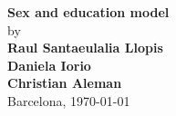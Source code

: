 \begin{center} 

\sf
\Large{
\textbf{Sex and education model}\\
\vspace{0.5cm}
\Large {by}\\  
\vspace{0.25cm}
\textbf{Raul Santaeulalia Llopis}\\
\vspace{0.25cm}
\textbf{Daniela Iorio}\\
\vspace{0.25cm}
\textbf{Christian Aleman}\\
}
\vspace{0.7cm}
\vspace{0.7cm}
Barcelona,\,\,\today \\
\vspace{0.3cm}
    

  
\end{center}




  
